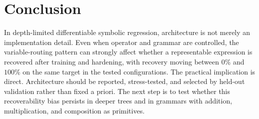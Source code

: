 \section{Conclusion}
\label{sec:conclusion}

In depth-limited differentiable symbolic regression,
architecture is not merely an implementation detail.  Even when
operator and grammar are controlled, the variable-routing
pattern can strongly affect whether a representable expression
is recovered after training and hardening, with recovery moving
between $0\%$ and $100\%$ on the same target in the tested
configurations.  The practical implication is direct.
Architecture should be reported, stress-tested, and selected by
held-out validation rather than fixed a priori.  The
next step is to test whether this recoverability bias persists
in deeper trees and in grammars with addition, multiplication,
and composition as primitives.
